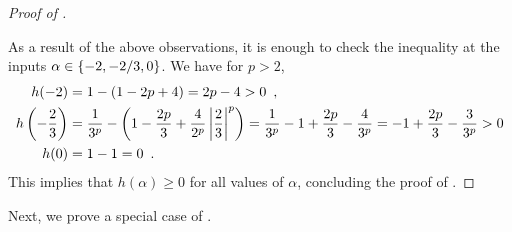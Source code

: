 \begin{proof}[Proof of ]
\begin{itemize}
\end{itemize}
As a result of the above observations, it is enough to check the inequality at the inputs $\alpha \in \left\{-2, -2/3, 0\right\}$. We have for $p>2$,
\begin{align*}
    h(-2) &= 1 - \left(1-2p+4\right) = 2p -4 > 0\enspace,\\
    h\left(-\frac{2}{3}\right) &= \frac{1}{3^p} - \left(1-\frac{2p}{3}+\frac{4}{2^p}\left\lvert \frac{2}{3} \right\rvert^p\right) = \frac{1}{3^p}-1+\frac{2p}{3}-\frac{4}{3^p} = -1 + \frac{2p}{3}-\frac{3}{3^p} > 0\\
    h(0) &= 1 - 1 = 0\enspace.
\end{align*}
This implies that $h(\alpha)\geq 0$ for all values of $\alpha$, concluding the proof of .
\end{proof}

Next, we prove a special case of .

